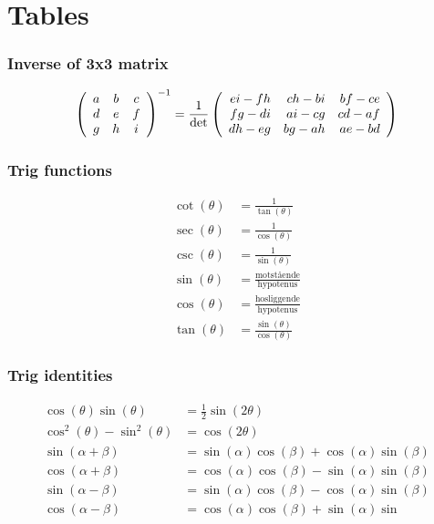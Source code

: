 \part{Tables}

\section{Inverse of 3x3 matrix}
\begin{equation}
\left(\begin{array}{ccc}
    a & b & c\\
    d & e & f\\
    g & h &i
\end{array}\right)^{-1}
=
{\frac{1}{\rm{det}}}
\left(\begin{array}{rrr}
    e i - f h & c h - b i & b f - c e\\
    f g - d i & a i - c g & c d - a f\\
    d h - e g & b g - a h & a e - b d
\end{array}\right)
\end{equation}


\section{Trig functions}
\begin{align}
    \cot(\theta) &= \frac{1}{\tan(\theta)}\\
    \sec(\theta) &= \frac{1}{\cos(\theta)}\\
    \csc(\theta) &= \frac{1}{\sin(\theta)}\\
    \sin(\theta) &= \frac{\text{motstående}}{\text{hypotenus}}\\
    \cos(\theta) &= \frac{\text{hosliggende}}{\text{hypotenus}}\\
    \tan(\theta) &= \frac{\sin(\theta)}{\cos(\theta)}
\end{align}

\section{Trig identities}
\begin{align}
    \cos(\theta)\sin(\theta) &= \frac{1}{2}\sin(2\theta)\\
    \cos^2(\theta)-\sin^2(\theta) &= \cos(2\theta)\\
    \sin(\alpha+\beta) &= \sin(\alpha)\cos(\beta) + \cos(\alpha)\sin(\beta)\\
    \cos(\alpha+\beta) &= \cos(\alpha)\cos(\beta) - \sin(\alpha)\sin(\beta)\\
    \sin(\alpha-\beta) &= \sin(\alpha)\cos(\beta) - \cos(\alpha)\sin(\beta)\\
    \cos(\alpha-\beta) &= \cos(\alpha)\cos(\beta) + \sin(\alpha)\sin\\
\end{align}

